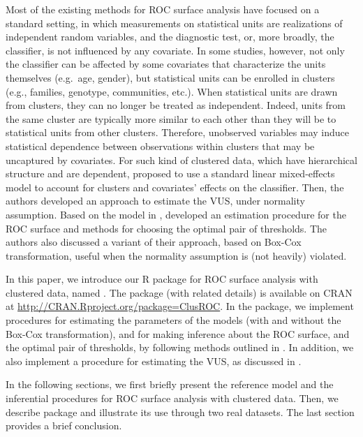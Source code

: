 Most of the existing methods for ROC surface analysis have focused on a standard setting, in which measurements on statistical units are realizations of independent random variables, and the diagnostic test, or, more broadly, the classifier, is not influenced by any covariate. In some studies, however, {\color{blue}  not only the classifier can be affected by some covariates that characterize the units themselves (e.g.~age, gender), but statistical units can be enrolled in clusters (e.g., families, genotype, communities, etc.). When statistical units are drawn from clusters, they can no longer be treated as independent. Indeed, units from the same cluster are typically more similar to each other than they will be to statistical units from other clusters. Therefore, unobserved variables may induce statistical dependence between observations within clusters that may be uncaptured by covariates.} For such kind of clustered data{\color{blue}, which have hierarchical structure and are dependent}, \citet{xiong2018estimating} proposed to use a standard linear {mixed-effects} model \citep{mcculloch2004generalized} to account for clusters and covariates' effects on the {classifier}. Then, the authors developed an approach to estimate the VUS, under {normality assumption}. Based on the model in \citet{xiong2018estimating}, \citet{khanh2022} developed an estimation procedure for the ROC surface and methods for choosing the optimal pair of thresholds. The authors also discussed a variant of their approach, based on Box-Cox transformation, useful when the {normality assumption} is (not heavily) violated.

In this paper, we introduce our R package for ROC surface analysis with clustered data, named . The package (with related details) is available on CRAN at \url{http://CRAN.Rproject.org/package=ClusROC}. In the package, we implement procedures for estimating the parameters of the models (with and without the Box-Cox transformation), and for making inference about the ROC surface, and the optimal pair of thresholds, by following methods outlined in \citet{khanh2022}. In addition, we also implement a procedure for estimating the VUS, as discussed in \citet{xiong2018estimating}.

{ In the following sections, we first briefly present the reference model and the inferential procedures for ROC surface analysis with clustered data. Then, we describe  package and illustrate its use through two real datasets. The last section provides a brief conclusion.}

